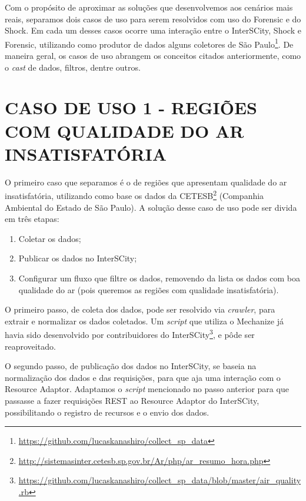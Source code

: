 Com o propósito de aproximar as soluções que desenvolvemos aos cenários mais
reais, separamos dois casos de uso para serem resolvidos com uso do Forensic e do
Shock. Em cada um desses casos ocorre uma interação entre o InterSCity, Shock e
Forensic, utilizando como produtor de dados alguns coletores de São
Paulo\footnote{\url{https://github.com/lucaskanashiro/collect_sp_data}}. De
maneira geral, os casos de uso abrangem os conceitos citados anteriormente,
como o \textit{cast} de dados, filtros, dentre outros.

\section{CASO DE USO 1 - REGIÕES COM QUALIDADE DO AR INSATISFATÓRIA}

O primeiro caso que separamos é o de regiões que apresentam qualidade do ar
insatisfatória, utilizando como base os dados da
CETESB\footnote{\url{http://sistemasinter.cetesb.sp.gov.br/Ar/php/ar_resumo_hora.php}}
(Companhia Ambiental do Estado de São Paulo).
A solução desse caso de uso pode ser divida em três etapas:
\begin{enumerate}
    \item Coletar os dados;
    \item Publicar os dados no InterSCity;
    \item Configurar um fluxo que filtre os dados, removendo
        da lista os dados com boa qualidade do ar (pois queremos as regiões
        com qualidade insatisfatória).
\end{enumerate}

O primeiro passo, de coleta dos dados, pode ser resolvido via \textit{crawler},
para extrair e normalizar os dados coletados. Um \textit{script} que
utiliza o Mechanize já havia sido desenvolvido por contribuidores do
InterSCity\footnote{\url{https://github.com/lucaskanashiro/collect_sp_data/blob/master/air_quality.rb}},
e pôde ser reaproveitado.

O segundo passo, de publicação dos dados no InterSCity, se baseia na
normalização dos dados e das requisições, para que aja uma interação com o
Resource Adaptor. Adaptamos o \textit{script} mencionado no passo anterior
para que passasse a fazer requisições REST ao Resource Adaptor do InterSCity,
possibilitando o registro de recursos e o envio dos dados.



